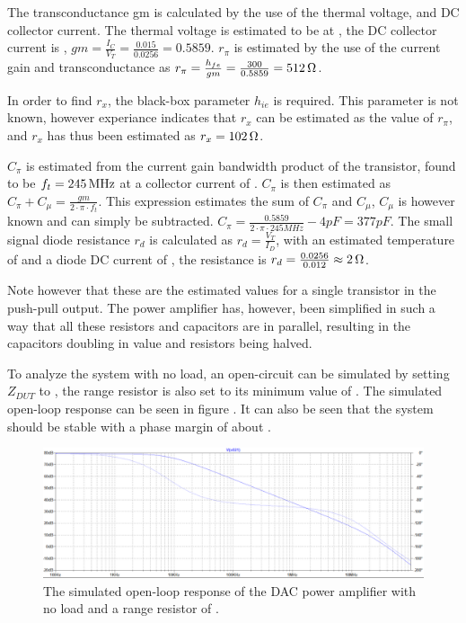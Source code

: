 The transconductance gm is calculated by the use of the thermal voltage, and DC collector current. The thermal voltage is estimated to be  at , the DC collector current is , $gm = \frac{I_C}{V_T} = \frac{0.015}{0.0256} = 0.5859$. $r_\pi$ is estimated by the use of the current gain and transconductance as $r_\pi = \frac{h_{fe}}{gm} = \frac{300}{0.5859} = \SI{512}{\ohm}$. 

In order to find $r_x$, the black-box parameter $h_{ie}$ is required. This parameter is not known, however experiance indicates that $r_x$ can be estimated as  the value of $r_\pi$, and $r_x$ has thus been estimated as $r_x = \SI{102}{\ohm}$.

$C_\pi$ is estimated from the current gain bandwidth product of the transistor, found to be $f_t = \SI{245}{\mega\hertz}$ at a collector current of . $C_\pi$ is then estimated as $C_\pi +C_\mu = \frac{gm}{2\cdot\pi\cdot f_t}$. This expression estimates the sum of $C_\pi$ and $C_\mu$, $C_\mu$ is however known and can simply be subtracted. $C_\pi = \frac{0.5859}{2\cdot\pi\cdot 245 MHz} -4 pF = 377 pF$. The small signal diode resistance $r_d$ is calculated as $r_d = \frac{V_T}{I_D}$, with an estimated temperature of  and a diode DC current of , the resistance is $r_d = \frac{0.0256}{0.012} \approx \SI{2}{\ohm}$. 

Note however that these are the estimated values for a single transistor in the push-pull output. The power amplifier has, however, been simplified in such a way that all these resistors and capacitors are in parallel, resulting in the capacitors doubling in value and resistors being halved. 


To analyze the system with no load, an open-circuit can be simulated by setting $Z_{DUT}$ to , the range resistor is also set to its minimum value of . The simulated open-loop response can be seen in figure . It can also be seen that the system should be stable with a phase margin of about . 

\begin{figure}[H]
    \centering
    \includegraphics[clip, trim=0 0 0 0, width=1\textwidth]{Sections/7_SystemDesign/Figures/7_1_1_5_DAC_PWR_AMP_NO_LOAD.pdf}
    \caption{The simulated open-loop response of the DAC power amplifier with no load and a range resistor of .}
    \label{fig_7_1_1_5_DAC_POWER_AMP_SIM_NL}
\end{figure}

